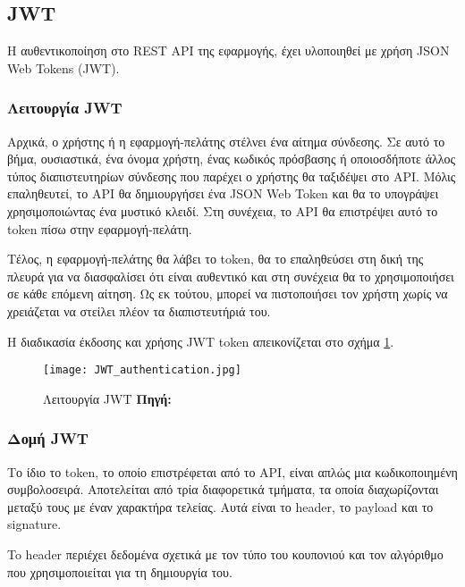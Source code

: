 \subsection{JWT}
Η αυθεντικοποίηση στο REST API της εφαρμογής, έχει υλοποιηθεί με χρήση JSON Web Tokens (JWT).

\subsubsection{Λειτουργία JWT}
Αρχικά, ο χρήστης ή η εφαρμογή-πελάτης στέλνει ένα αίτημα σύνδεσης. Σε αυτό το βήμα, ουσιαστικά, ένα όνομα χρήστη, ένας κωδικός πρόσβασης ή οποιοσδήποτε άλλος τύπος διαπιστευτηρίων σύνδεσης που παρέχει ο χρήστης θα ταξιδέψει στο API. Μόλις επαληθευτεί, το API θα δημιουργήσει ένα JSON Web Token και θα το υπογράψει χρησιμοποιώντας ένα μυστικό κλειδί. Στη συνέχεια, το API θα επιστρέψει αυτό το token πίσω στην εφαρμογή-πελάτη.

Τέλος, η εφαρμογή-πελάτης θα λάβει το token, θα το επαληθεύσει στη δική της πλευρά για να διασφαλίσει ότι είναι αυθεντικό και στη συνέχεια θα το χρησιμοποιήσει σε κάθε επόμενη αίτηση. Ως εκ τούτου, μπορεί να πιστοποιήσει τον χρήστη χωρίς να χρειάζεται να στείλει πλέον τα διαπιστευτήριά του.

Η διαδικασία έκδοσης και χρήσης JWT token απεικονίζεται στο σχήμα \ref{fig:JWT_authentication}.

\begin{figure}[h]
	\centering
	\texttt{[image: JWT\_authentication.jpg]}
	\caption[{Λειτουργία JWT}]{Λειτουργία JWT \textbf{Πηγή:} \cite{fig_JWT_authentication}}
	\label{fig:JWT_authentication}
\end{figure}

\subsubsection{Δομή JWT}
Το ίδιο το token, το οποίο επιστρέφεται από το API, είναι απλώς μια κωδικοποιημένη συμβολοσειρά. Αποτελείται από τρία διαφορετικά τμήματα, τα οποία διαχωρίζονται μεταξύ τους με έναν χαρακτήρα τελείας. Αυτά είναι το header, το payload και το signature.

To header περιέχει δεδομένα σχετικά με τον τύπο του κουπονιού και τον αλγόριθμο που χρησιμοποιείται για τη δημιουργία του.

